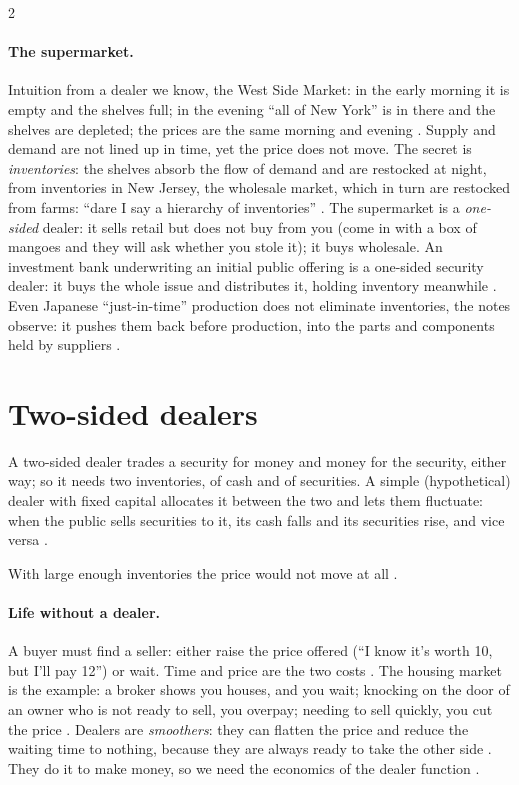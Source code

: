 \begin{paracol}{2}
\paragraph{The supermarket.} Intuition from a dealer we know, the West Side Market: in the early morning it is empty and the shelves full; in the evening ``all of New York''
is in there and the shelves are depleted; the prices are the same morning and evening . Supply and demand are not lined up in time, yet the price
does not move. The secret is \emph{inventories}: the shelves absorb the flow of demand and are restocked at night, from inventories in New Jersey, the wholesale market, which in
turn are restocked from farms: ``dare I say a hierarchy of inventories'' . The supermarket is a \emph{one-sided} dealer: it sells
retail but does not buy from you (come in with a box of mangoes and they will ask whether you stole it); it buys wholesale. An investment bank underwriting an initial public
offering is a one-sided security dealer: it buys the whole issue and distributes it, holding inventory meanwhile . Even Japanese ``just-in-time'' production
does not eliminate inventories, the notes observe: it pushes them back before production, into the parts and components held by suppliers .

\section{Two-sided dealers}\label{sec:dl-twosided}

A two-sided dealer trades a security for money and money for the security, either way; so it needs two inventories, of cash and of securities. A simple (hypothetical)
dealer with fixed capital allocates it between the two and lets them fluctuate: when the public sells securities to it, its cash falls and its securities rise, and vice versa
.
\begin{taccts}
\end{taccts}
With large enough inventories the price would not move at all .

\paragraph{Life without a dealer.} A buyer must find a seller: either raise the price offered (``I know it's worth 10, but I'll pay 12'') or wait. Time and price are the two
costs . The housing market is the example: a broker shows you houses, and you wait; knocking on the door of an owner who is not ready to
sell, you overpay; needing to sell quickly, you cut the price . Dealers are \emph{smoothers}: they can flatten the price and reduce the
waiting time to nothing, because they are always ready to take the other side . They do it to make money, so we need the economics of the dealer
function .


\end{paracol}
